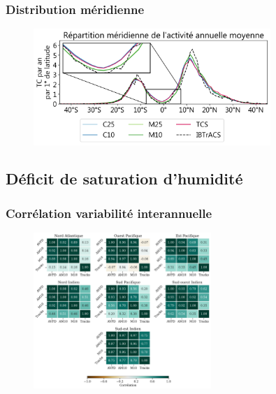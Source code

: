 \documentclass[aspectratio=169, usepdftitle=false, xcolor={dvipsnames}, 9pt,table]{beamer}
\begin{document}
\begin{frame}[c]
    \frametitle{Distribution méridienne}
    \begin{figure}
        \centering
        \includegraphics[width=0.8\textwidth]{Figures/Annexes/zonal.png}
    \end{figure} 
\end{frame}

\subsection*{Déficit de saturation d'humidité}
\begin{frame}[c]
    \frametitle{Corrélation variabilité interannuelle}
    \begin{figure}
        \centering
        \includegraphics[width=0.6\textwidth]{Figures/Annexes/corr_AVPD_AM10_M10_tracks.png}
    \end{figure} 
\end{frame}
\end{document}
